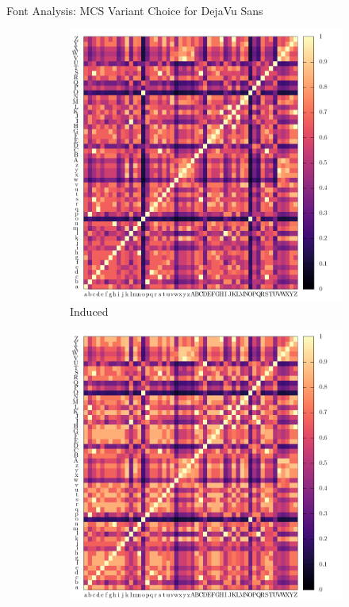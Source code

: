 \documentclass[10pt]{beamer}
\begin{document}
\begin{frame}{Font Analysis: MCS Variant Choice for DejaVu Sans}
	\begin{figure}
		\centering
		\begin{subfigure}[b]{0.3\linewidth}
			\includegraphics[width=\linewidth, height=0.9\linewidth]{../tables/dejavu-sans/induced-conf-nrm.pdf}
			\caption{
				Induced
				\label{fig:heat:filter:induced}
			}
		\end{subfigure}
		\begin{subfigure}[b]{0.3\linewidth}
			\includegraphics[width=\linewidth, height=0.9\linewidth]{../tables/dejavu-sans/edgecountinc-conf-nrm.pdf}

\end{subfigure}
\end{figure}
\end{frame}
\end{document}
